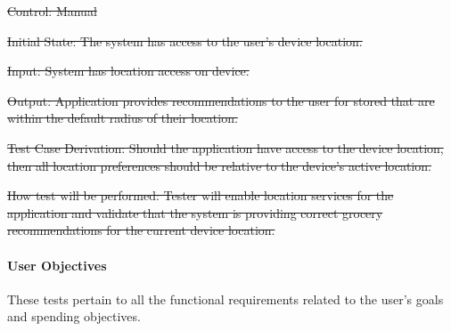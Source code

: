 \documentclass[12pt, titlepage]{article}
\begin{document}
\begin{enumerate}
\sout{Control: Manual}
          
\sout{Initial State: The system has access to the user's device location.}

\sout{Input: System has location access on device.}
          
\sout{Output: Application provides recommendations to the user for stored that are within the default radius of their location.}

\sout{Test Case Derivation: Should the application have access to the device location, then all location preferences should be
relative to the device's active location.}
          
\sout{How test will be performed: Tester will enable location services for the application and validate that the system is providing correct grocery recommendations for the current device location.}

\end{enumerate}

\paragraph{User Objectives}

These tests pertain to all the functional requirements related to the user's goals and spending objectives.
\end{document}
